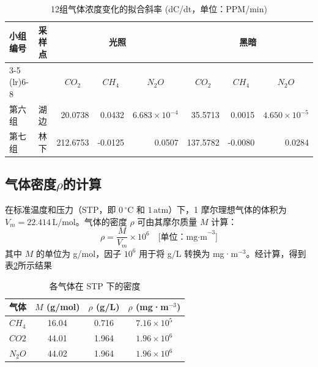 \documentclass[10.5pt]{config}
\begin{document}
\begin{table}[htbp]
    \centering
    \caption{12组气体浓度变化的拟合斜率 (dC/dt，单位：PPM/min)}
    \label{tab:dcdt-slopes-final}
    
    \begin{tabular}{llrrrrrr}
        \toprule
        
        \multirow{2}{*}{小组编号} & \multirow{2}{*}{采样点} & \multicolumn{3}{c}{光照} & \multicolumn{3}{c}{黑暗} \\
        \cmidrule(lr){3-5} \cmidrule(lr){6-8} %
        
        & & \multicolumn{1}{c}{$CO_2$} & \multicolumn{1}{c}{$CH_4$} & \multicolumn{1}{c}{$N_2O$} & \multicolumn{1}{c}{$CO_2$} & \multicolumn{1}{c}{$CH_4$} & \multicolumn{1}{c}{$N_2O$} \\
        
        \midrule
        
        第六组 & 湖边 & 20.0738 & 0.0432 & $6.683 \times 10^{-4}$ & 35.5713 & 0.0015 & $4.650 \times 10^{-5}$ \\
        
        第七组 & 林下 & 212.6753 & -0.0125 & 0.0507 & 137.5782 & -0.0080 & 0.0284 \\
        
        \bottomrule
    \end{tabular}
\end{table}

\subsection{气体密度$\rho$的计算}

在标准温度和压力（STP，即 $0\,^\circ\mathrm{C}$ 和 $1\,\text{atm}$）下，1 摩尔理想气体的体积为 
$V_m = 22.414\,\text{L/mol}$。气体的密度 $\rho$ 可由其摩尔质量 $M$ 计算：
\[
\rho = \frac{M}{V_m} \times 10^6 \quad \text{[单位：mg·m}^{-3}\text{]}
\]
其中 $M$ 的单位为 g/mol，因子 $10^6$ 用于将 g/L 转换为 mg·m$^{-3}$。经计算，得到表\ref{tab:gas-densities-mg-m3}所示结果

\begin{table}[h]
    \centering
    \caption{各气体在 STP 下的密度}
    \label{tab:gas-densities-mg-m3}
    \begin{tabular}{lccc}
        \toprule
        气体 &  $M$ (g/mol) & $\rho$ (g/L) & $\rho$ (mg·m$^{-3}$) \\
        \midrule
        $CH_4$  & 16.04 & 0.716 & $7.16 \times 10^{5}$ \\
        $CO2$ & 44.01 & 1.964 & $1.96 \times 10^{6}$ \\
        $N_2O$  & 44.02 & 1.964 & $1.96 \times 10^{6}$ \\
        \bottomrule
    \end{tabular}
\end{table}
\end{document}
